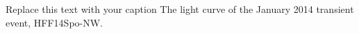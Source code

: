 Replace this text with your caption
  The light curve of the January 2014 transient event, HFF14Spo-NW.